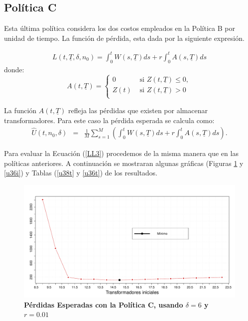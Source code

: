 
\subsection{Pol\'itica C}
\noindent Esta \'ultima pol\'itica considera los dos costos empleados en la Pol\'itica B por unidad de tiempo. La funci\'on de p\'erdida, esta dada por la siguiente expresi\'on.


\begin{eqnarray}
L(t,\underline{T},\delta,n_0)=\int_{0}^{t} W(s,\underline{T}) ds + r \int_{0}^{t} A(s,\underline{T}) ds
\end{eqnarray}
donde:
\[
A(t,\underline{T})=\left\{
\begin{array}{cl}
\displaystyle 0 & \mbox{ si } Z(t,\underline{T})\leq 0,\\                                                               Z(t)      &     \mbox{ si } Z(t,\underline{T})>0  \\
\end{array}
\right.
\]

\noindent La funci\'on $A(t,\underline{T})$ refleja las p\'erdidas que existen por almacenar transformadores. Para este caso la p\'erdida esperada se calcula como:
\begin{eqnarray}\label{LL3}
\hat{U}(t,n_0,\delta)&=& \frac{1}{M}\sum_{s=1}^M \left(     \int_{0}^{t} W(s,\underline{T}) ds + r \int_{0}^{t} A(s,\underline{T}) ds       \right).
\end{eqnarray}

\noindent Para evaluar la Ecuaci\'on (\ref{LL3}) procedemos de la misma manera que en las pol\'iticas anteriores.  A continuaci\'on se mostraran algunas gr\'aficas (Figuras \ref{u38i} y \ref{u36i}) y Tablas  (\ref{u38t} y \ref{u36t}) de los resultados.

\begin{figure}[h!]
\begin{center}
\includegraphics[scale=0.3]{uA8.pdf}
\end{center}
\vspace{-1 cm} \caption{\bf P\'erdidas Esperadas con la Pol\'itica C, usando $\delta=6$ y $r=0.01$}\label{u38i}
\end{figure}


